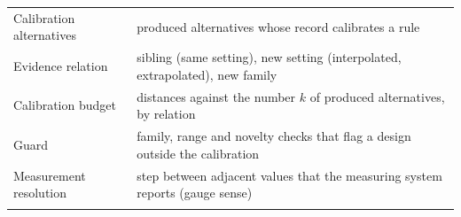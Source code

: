 \documentclass[pdflatex,sn-basic,lineno]{sn-jnl}
\newcommand{\tabsize}{\fontsize{8}{9.5}\selectfont}
\newcommand{\tabsizesmall}{\footnotesize}%
\providecommand{\DIFdelbegin}{} %
\providecommand{\DIFaddbeginFL}{} %
\providecommand{\DIFaddendFL}{} %
\providecommand{\DIFdelbeginFL}{} %
\providecommand{\DIFdelendFL}{} %
\newcommand{\DIFscaledelfig}{0.5}
\newlength{\DIFdelgraphicswidth} %
\newlength{\DIFdelgraphicsheight} %
\newcommand{\DIFaddincludegraphics}[2][]{{\color{blue}\fbox{\DIFOincludegraphics[#1]{#2}}}} %
\newcommand{\DIFdelincludegraphics}[2][]{%
\sbox{\DIFdelgraphicsbox}{\DIFOincludegraphics[#1]{#2}}%
\settoboxwidth{\DIFdelgraphicswidth}{\DIFdelgraphicsbox} %
\settoboxtotalheight{\DIFdelgraphicsheight}{\DIFdelgraphicsbox} %
\scalebox{\DIFscaledelfig}{%
\parbox[b]{\DIFdelgraphicswidth}{\usebox{\DIFdelgraphicsbox}\\[-\baselineskip] \rule{\DIFdelgraphicswidth}{0em}}\llap{\resizebox{\DIFdelgraphicswidth}{\DIFdelgraphicsheight}{%
\setlength{\unitlength}{\DIFdelgraphicswidth}%
\begin{picture}(1,1)%
\thicklines\linethickness{2pt} %
{\color[rgb]{1,0,0}\put(0,0){\framebox(1,1){}}}%
{\color[rgb]{1,0,0}\put(0,0){\line( 1,1){1}}}%
{\color[rgb]{1,0,0}\put(0,1){\line(1,-1){1}}}%
\end{picture}%
}\hspace*{3pt}}} %
} %
\DeclareRobustCommand{\DIFdelbegin}{\DIFOdelbegin \let\includegraphics\DIFdelincludegraphics} %
\DeclareRobustCommand{\DIFaddbeginFL}{\DIFOaddbeginFL \let\includegraphics\DIFaddincludegraphics} %
\DeclareRobustCommand{\DIFaddendFL}{\DIFOaddendFL \let\includegraphics\DIFOincludegraphics} %
\DeclareRobustCommand{\DIFdelbeginFL}{\DIFOdelbeginFL \let\includegraphics\DIFdelincludegraphics} %
\DeclareRobustCommand{\DIFdelendFL}{\DIFOaddendFL \let\includegraphics\DIFOincludegraphics} %
\begin{document}
\begin{appendices}
\begin{table}[p]
\begin{tabular}{@{}L{3.0cm}L{9.75cm}@{}}
Calibration alternatives & produced alternatives whose record calibrates a rule \\
Evidence relation & sibling (same setting), new setting (interpolated, extrapolated), new family \\
Calibration budget & distances against the number $k$ of produced alternatives, by relation \\
Guard & family, range and novelty checks that flag a design outside the calibration \\
Measurement resolution & step between adjacent values that the measuring system reports (gauge sense) \\
\botrule
\end{tabular}
\DIFaddendFL \end{table}

\DIFdelbegin %
\DIFdelendFL \DIFaddbeginFL \begin{table}[p]
\tabsizesmall
\setlength{\tabcolsep}{1.4pt}
\DIFaddendFL \caption{Decisive/safe distances (floors) under the robustness variants}\label{tab:robust}
\DIFdelbeginFL %

\end{table}
\end{appendices}
\end{document}
